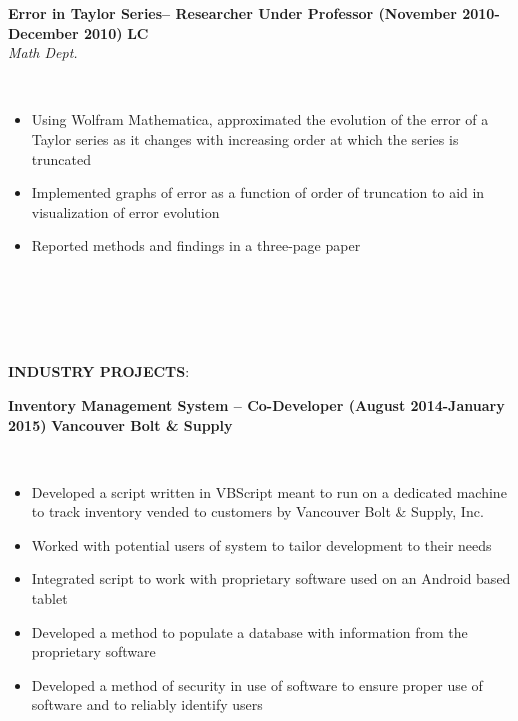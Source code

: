 \documentclass{article}
\begin{document}
%
%
%
%
\begin{vwcol}[widths={0.8,0.2}, sep=.8cm, justify=flush, rule=0pt, indent=0em]
\noindent \textbf{Error in Taylor Series– Researcher Under Professor (November 2010-December 2010)}
\newpage
\noindent \textbf{LC}\\
\noindent \emph{Math Dept.}
\end{vwcol}
\phantom \\
\begin{itemize}
\item Using Wolfram Mathematica, approximated the evolution of the error of a Taylor series as it changes with increasing order at which the series is truncated
\item Implemented graphs of error as a function of order of truncation to aid in visualization of error evolution
\item Reported methods and findings in a three-page paper
\end{itemize}
\phantom \\
\phantom \\
%
%
%
%
\par
\phantom \\
\phantom \\
\newpage
\noindent \textbf{INDUSTRY PROJECTS}: \\
\begin{vwcol}[widths={0.8,0.2}, sep=.8cm, justify=flush, rule=0pt, indent=0em]
\noindent \textbf{Inventory Management System – Co-Developer (August 2014-January 2015)}
\newpage
\noindent \textbf{Vancouver Bolt \& Supply}
\end{vwcol}
\phantom \\
\begin{itemize}
\item Developed a script written in VBScript meant to run on a dedicated machine to track inventory vended to customers by Vancouver Bolt \& Supply, Inc.
\item Worked with potential users of system to tailor development to their needs
\item Integrated script to work with proprietary software used on an Android based tablet
\item Developed a method to populate a database with information from the proprietary software
\item Developed a method of security in use of software to ensure proper use of software and to reliably identify users
\end{itemize}
\end{document}
